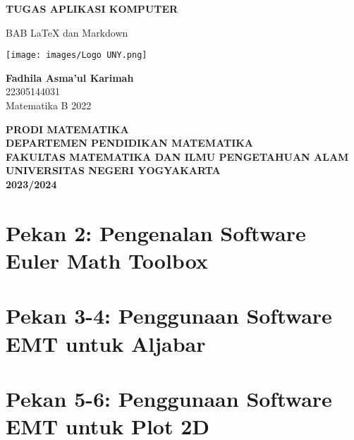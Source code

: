 \documentclass{report}
\begin{document}
\begin{titlepage}
    \begin{center}
        \vspace*{0,2cm}

        \Huge
        \textbf{TUGAS APLIKASI KOMPUTER}
        
        \vspace{1cm}
        
        \LARGE
        BAB LaTeX dan Markdown  
        
        \vspace{1cm}
        
        \texttt{[image: images/Logo UNY.png]}

        \vspace{1cm}
        
        \textbf{Fadhila Asma'ul Karimah}\\
        22305144031\\
        Matematika B 2022
        
        \vspace{2cm}
        
        \Large
        \textbf{PRODI MATEMATIKA}\\
        \textbf{DEPARTEMEN PENDIDIKAN MATEMATIKA}\\
        \textbf{FAKULTAS MATEMATIKA DAN ILMU PENGETAHUAN ALAM}
        \textbf{UNIVERSITAS NEGERI YOGYAKARTA}\\
        \textbf{2023/2024}
        
    \end{center}
\end{titlepage}

\newpage
\tableofcontents
\chapter{Pekan 2: Pengenalan Software Euler Math Toolbox}

\newpage
\chapter{Pekan 3-4: Penggunaan Software EMT untuk Aljabar}

\newpage
\chapter{Pekan 5-6: Penggunaan Software EMT untuk Plot 2D}

\newpage
\end{document}
